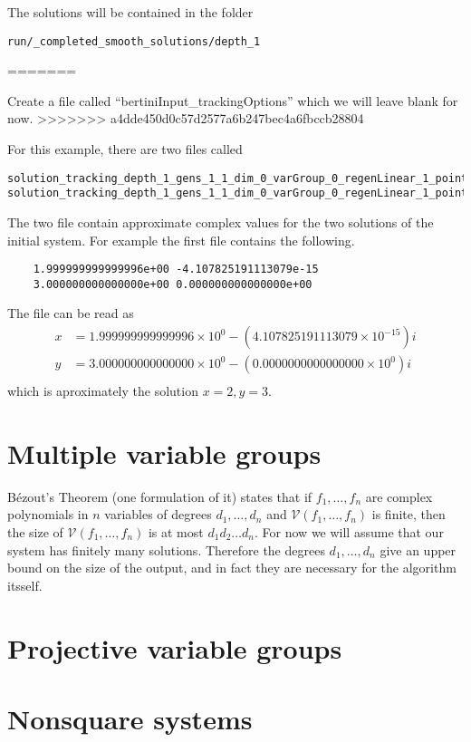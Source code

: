 \documentclass[12pt]{article}
\begin{document}
The solutions will be contained in the folder 
\begin{lstlisting}
run/_completed_smooth_solutions/depth_1
\end{lstlisting}
=======

Create a file called ``bertiniInput\_trackingOptions'' which we will 
leave blank for now.
>>>>>>> a4dde450d0c57d2577a6b247bec4a6fbccb28804

For this example, there are two files called 
\begin{lstlisting}
solution_tracking_depth_1_gens_1_1_dim_0_varGroup_0_regenLinear_1_pointId_326664877375_788310760051
solution_tracking_depth_1_gens_1_1_dim_0_varGroup_0_regenLinear_1_pointId_918720474422_183602510053 
\end{lstlisting}
The two file contain approximate complex values for the two solutions of 
the initial system. For example the first file contains the following.

\begin{lstlisting}
    1.999999999999996e+00 -4.107825191113079e-15
    3.000000000000000e+00 0.000000000000000e+00
\end{lstlisting}

\noindent The file can be read as
\begin{align*}
    x &= 1.999999999999996 \times 10^0 - (4.107825191113079 \times 
    10^{-15})i\\
    y &= 3.000000000000000 \times 10^0 - (0.0000000000000000 \times 
    10^{0})i\\
\end{align*}
which is aproximately the solution $x = 2, y = 3$.


\section{Multiple variable groups}
B\'{e}zout's Theorem (one formulation of it) states that if 
$f_1, \ldots, f_n$ are complex polynomials in $n$ variables of degrees 
$d_1, \ldots, d_n$ and $\mathcal{V}(f_1, \ldots, f_n)$ is finite, then 
the size of $\mathcal{V}(f_1, \ldots, f_n)$ is at most $d_1d_2 \ldots d_n$. 
For now we will assume that our system has finitely many solutions.
Therefore the degrees $d_1, \ldots, d_n$ give an upper bound on the size 
of the output, and in fact they are necessary for the algorithm itsself.
\section{Projective variable groups}
\section{Nonsquare systems}
\end{document}
